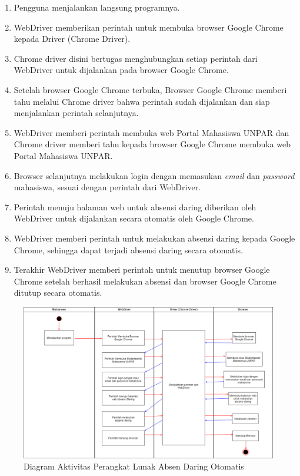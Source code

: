 \begin{enumerate}
	\item Pengguna menjalankan langsung programnya.
	\item WebDriver memberikan perintah untuk membuka browser Google Chrome kepada Driver (Chrome Driver).
	\item Chrome driver disini bertugas menghubungkan setiap perintah dari WebDriver untuk dijalankan pada browser Google Chrome.
	\item Setelah browser Google Chrome terbuka, Browser Google Chrome memberi tahu melalui Chrome driver bahwa perintah sudah dijalankan dan siap menjalankan perintah selanjutnya.
	\item WebDriver memberi perintah membuka web Portal Mahasiswa UNPAR dan Chrome driver memberi tahu kepada browser Google Chrome membuka web Portal Mahasiswa UNPAR.
	\item Browser selanjutnya melakukan login dengan memasukan \textit{email} dan \textit{password} mahasiswa, sesuai dengan perintah dari WebDriver.
	\item Perintah menuju halaman web untuk absensi daring diberikan oleh WebDriver untuk dijalankan secara otomatis oleh Google Chrome.
	\item WebDriver memberi perintah untuk melakukan absensi daring kepada Google Chrome, sehingga dapat terjadi absensi daring secara otomatis.  
	\item Terakhir WebDriver memberi perintah untuk menutup browser Google Chrome setelah berhasil melakukan absensi dan browser Google Chrome ditutup secara otomatis.
\end{enumerate}
\begin{figure}[H]
	\centering
	\includegraphics[scale=0.4]{Gambar/ActivityAplikasi.png}
	\caption{Diagram Aktivitas Perangkat Lunak Absen Daring Otomatis} 
	\label{fig:ActivityAplikasi}
\end{figure}


